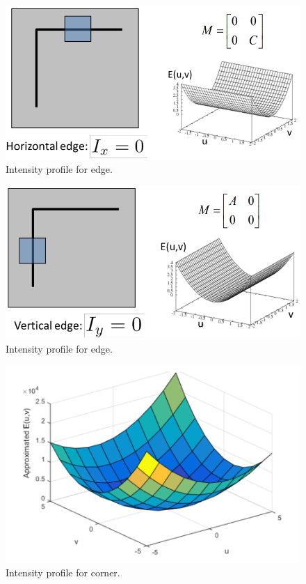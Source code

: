 \documentclass[a4paper]{article}
\begin{document}
\begin{multicols}{3}
 
 \begin{figure}[H]
     \centering
     \includegraphics[width=.98\linewidth]{img/opt_flow/hessian_edge_x.PNG}
     \caption{Intensity profile for edge.}
 \end{figure}
 \columnbreak
 
  \begin{figure}[H]
     \centering
     \includegraphics[width=.98\linewidth]{img/opt_flow/hessian_edge_y.PNG}
     \caption{Intensity profile for edge.}
 \end{figure}
  \columnbreak
  
   \begin{figure}[H]
     \centering
     \includegraphics[width=.98\linewidth]{img/opt_flow/hessian_corner.PNG}
     \caption{Intensity profile for corner.}
 \end{figure}
\end{multicols}
\end{document}
